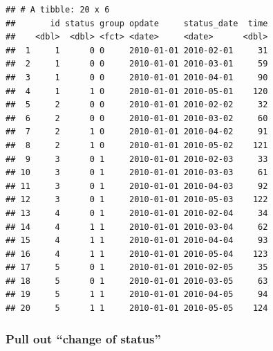 \documentclass[
]{book}
\newenvironment{Shaded}{\begin{snugshade}}{\end{snugshade}}
\newcommand{\CommentTok}[1]{\textcolor[rgb]{0.56,0.35,0.01}{\textit{#1}}}
\newcommand{\DataTypeTok}[1]{\textcolor[rgb]{0.13,0.29,0.53}{#1}}
\newcommand{\DecValTok}[1]{\textcolor[rgb]{0.00,0.00,0.81}{#1}}
\newcommand{\KeywordTok}[1]{\textcolor[rgb]{0.13,0.29,0.53}{\textbf{#1}}}
\newcommand{\NormalTok}[1]{#1}
\newcommand{\OperatorTok}[1]{\textcolor[rgb]{0.81,0.36,0.00}{\textbf{#1}}}
\newcommand{\OtherTok}[1]{\textcolor[rgb]{0.56,0.35,0.01}{#1}}
\newcommand{\StringTok}[1]{\textcolor[rgb]{0.31,0.60,0.02}{#1}}
\begin{document}
\begin{verbatim}
## # A tibble: 20 x 6
##       id status group opdate     status_date  time
##    <dbl>  <dbl> <fct> <date>     <date>      <dbl>
##  1     1      0 0     2010-01-01 2010-02-01     31
##  2     1      0 0     2010-01-01 2010-03-01     59
##  3     1      0 0     2010-01-01 2010-04-01     90
##  4     1      1 0     2010-01-01 2010-05-01    120
##  5     2      0 0     2010-01-01 2010-02-02     32
##  6     2      0 0     2010-01-01 2010-03-02     60
##  7     2      1 0     2010-01-01 2010-04-02     91
##  8     2      1 0     2010-01-01 2010-05-02    121
##  9     3      0 1     2010-01-01 2010-02-03     33
## 10     3      0 1     2010-01-01 2010-03-03     61
## 11     3      0 1     2010-01-01 2010-04-03     92
## 12     3      0 1     2010-01-01 2010-05-03    122
## 13     4      0 1     2010-01-01 2010-02-04     34
## 14     4      1 1     2010-01-01 2010-03-04     62
## 15     4      1 1     2010-01-01 2010-04-04     93
## 16     4      1 1     2010-01-01 2010-05-04    123
## 17     5      0 1     2010-01-01 2010-02-05     35
## 18     5      0 1     2010-01-01 2010-03-05     63
## 19     5      1 1     2010-01-01 2010-04-05     94
## 20     5      1 1     2010-01-01 2010-05-05    124
\end{verbatim}

\hypertarget{pull-out-change-of-status}{%
\subsubsection{Pull out ``change of status''}\label{pull-out-change-of-status}}

\begin{Shaded}
\end{Shaded}
\end{document}
